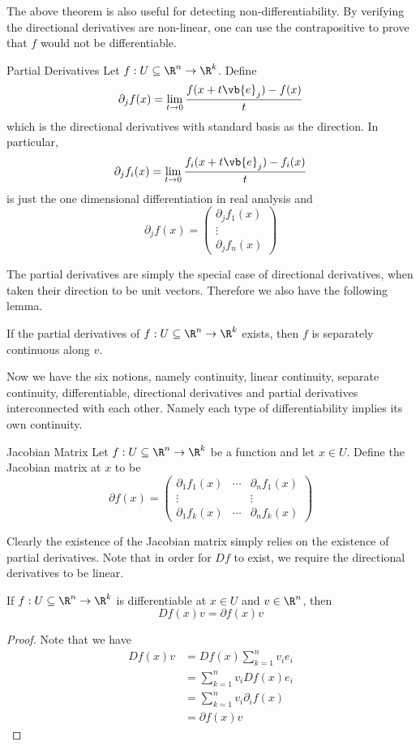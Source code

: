 \documentclass[a4paper]{article}
\begin{document}
The above theorem is also useful for detecting non-differentiability. By verifying the directional derivatives are non-linear, one can use the contrapositive to prove that $f$ would not be differentiable. 

\begin{defn}{Partial Derivatives}{} Let $f:U\subseteq\R^n\to\R^k$. Define $$\partial_jf(x)=\lim_{t\to0}\frac{f(x +t\vb{e}_j)-f(x)}{t}$$ which is the directional derivatives with standard basis as the direction. In particular, $$\partial_jf_i(x)=\lim_{t\to0}\frac{f_i(x +t\vb{e}_j)-f_i(x )}{t}$$ is just the one dimensional differentiation in real analysis and $$\partial_jf(x)=\begin{pmatrix}
\partial_jf_1(x)\\
\vdots\\
\partial_jf_n(x)
\end{pmatrix}$$
\end{defn}

The partial derivatives are simply the special case of directional derivatives, when taken their direction to be unit vectors. Therefore we also have the following lemma. 

\begin{prp} If the partial derivatives of $f:U\subseteq\R^n\to\R^k$ exists, then $f$ is separately continuous along $v$. 
\end{prp}

Now we have the six notions, namely continuity, linear continuity, separate continuity, differentiable, directional derivatives and partial derivatives interconnected with each other. Namely each type of differentiability implies its own continuity. 

\begin{defn}{Jacobian Matrix}{} Let $f:U\subseteq\R^n\to\R^k$ be a function and let $x\in U$. Define the Jacobian matrix at $x$ to be $$\partial f(x)=\begin{pmatrix}
\partial_1f_1(x) & \cdots & \partial_nf_1(x)\\
\vdots & & \vdots\\
\partial_1f_k(x) & \cdots & \partial_nf_k(x)
\end{pmatrix}$$
\end{defn}

Clearly the existence of the Jacobian matrix simply relies on the existence of partial derivatives. Note that in order for $Df$ to exist, we require the directional derivatives to be linear. 

\begin{thm}{}{} If $f:U\subseteq\R^n\to\R^k$ is differentiable at $x\in U$ and $v\in\R^n$, then $$Df(x)v=\partial f(x)v$$ \tcbline
\begin{proof}
Note that we have
\begin{align*}
Df(x)v&=Df(x)\sum_{k=1}^nv_ie_i\\
&=\sum_{k=1}^nv_iDf(x)e_i\\
&=\sum_{k=1}^nv_i\partial_if(x)\\
&=\partial f(x)v
\end{align*}
\end{proof}
\end{thm}
\end{document}
